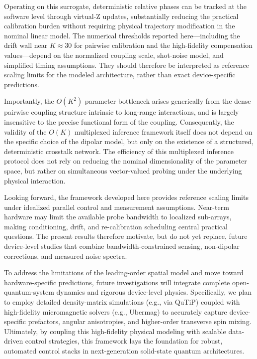 \documentclass[a4paper,twocolumn,11pt]{quantumarticle}
\begin{document}
Operating on this surrogate, deterministic relative phases can be tracked at the software level through virtual-Z updates, substantially reducing the practical calibration burden without requiring physical trajectory modification in the nominal linear model. The numerical thresholds reported here---including the drift wall near $K\approx30$ for pairwise calibration and the high-fidelity compensation values---depend on the normalized coupling scale, shot-noise model, and simplified timing assumptions. They should therefore be interpreted as reference scaling limits for the modeled architecture, rather than exact device-specific predictions. 

Importantly, the $O(K^2)$ parameter bottleneck arises generically from the dense pairwise coupling structure intrinsic to long-range interactions, and is largely insensitive to the precise functional form of the coupling. Consequently, the validity of the $O(K)$ multiplexed inference framework itself does not depend on the specific choice of the dipolar model, but only on the existence of a structured, deterministic crosstalk network. The efficiency of this multiplexed inference protocol does not rely on reducing the nominal dimensionality of the parameter space, but rather on simultaneous vector-valued probing under the underlying physical interaction.

Looking forward, the framework developed here provides reference scaling limits under idealized parallel control and measurement assumptions. Near-term hardware may limit the available probe bandwidth to localized sub-arrays, making conditioning, drift, and re-calibration scheduling central practical questions. The present results therefore motivate, but do not yet replace, future device-level studies that combine bandwidth-constrained sensing, non-dipolar corrections, and measured noise spectra.

To address the limitations of the leading-order spatial model and move toward hardware-specific predictions, future investigations will integrate complete open-quantum-system dynamics and rigorous device-level physics. Specifically, we plan to employ detailed density-matrix simulations (e.g., via QuTiP) coupled with high-fidelity micromagnetic solvers (e.g., Ubermag) to accurately capture device-specific prefactors, angular anisotropies, and higher-order transverse spin mixing. Ultimately, by coupling this high-fidelity physical modeling with scalable data-driven control strategies, this framework lays the foundation for robust, automated control stacks in next-generation solid-state quantum architectures.
\end{document}
